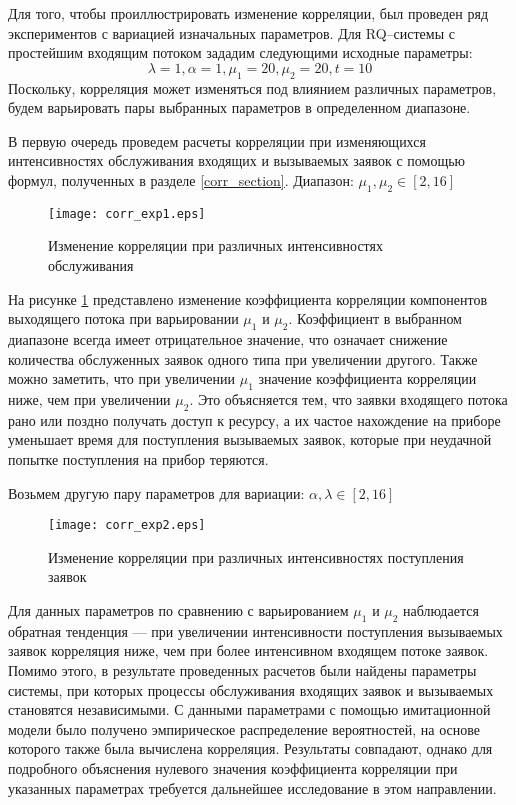 Для того, чтобы проиллюстрировать изменение корреляции, был проведен ряд экспериментов с вариацией изначальных параметров.
Для RQ--системы с простейшим входящим потоком зададим следующими исходные параметры:
\begin{equation} \label{simple_summary_input_params_corr}
	\lambda = 1,
	\alpha = 1,
	\mu_{1} = 20,
	\mu_{2} = 20, 
	t = 10
\end{equation}
Поскольку, корреляция может изменяться под влиянием различных параметров, будем варьировать пары выбранных параметров в определенном диапазоне.

В первую очередь проведем расчеты корреляции при изменяющихся интенсивностях обслуживания входящих и вызываемых заявок с помощью формул, полученных в разделе \ref{corr_section}. Диапазон: $\mu_{1},\mu_{2} \in [2,16]$

\begin{figure}[H]
	\centering
	\texttt{[image: corr\_exp1.eps]}
	\caption{Изменение корреляции при различных интенсивностях обслуживания}
	\label{exps_corr_exp1}
\end{figure} 

На рисунке \ref{exps_corr_exp1} представлено изменение коэффициента корреляции компонентов выходящего потока при варьировании $\mu_{1}$ и $\mu_{2}$. Коэффициент в выбранном диапазоне всегда имеет отрицательное значение, что означает снижение количества обслуженных заявок одного типа при увеличении другого. Также можно заметить, что при увеличении $\mu_{1}$ значение коэффициента корреляции ниже, чем при увеличении $\mu_{2}$. Это объясняется тем, что заявки входящего потока рано или поздно получать доступ к ресурсу, а их частое нахождение на приборе уменьшает время для поступления вызываемых заявок, которые при неудачной попытке поступления на прибор теряются.

Возьмем другую пару параметров для вариации: $\alpha,\lambda \in [2,16]$

\begin{figure}[H]
	\centering
	\texttt{[image: corr\_exp2.eps]}
	\caption{Изменение корреляции при различных интенсивностях поступления заявок}
	\label{exps_corr_exp2}
\end{figure} 

Для данных параметров по сравнению с варьированием $\mu_{1}$ и $\mu_{2}$ наблюдается обратная тенденция --- при увеличении интенсивности поступления вызываемых заявок корреляция ниже, чем при более интенсивном входящем потоке заявок. Помимо этого, в результате проведенных расчетов были найдены параметры системы, при которых процессы обслуживания входящих заявок и вызываемых становятся независимыми. С данными параметрами с помощью имитационной модели было получено эмпирическое распределение вероятностей, на основе которого также была вычислена корреляция. Результаты совпадают, однако для подробного объяснения нулевого значения коэффициента корреляции при указанных параметрах требуется дальнейшее исследование в этом направлении.

